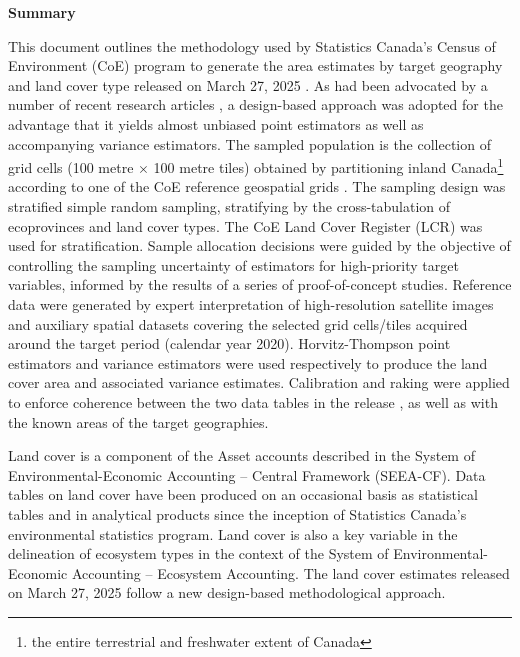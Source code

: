 

\begin{center}
\begin{minipage}{5.5in}
\begin{center}
\textbf{\large Summary}
\end{center}
This document outlines the methodology used by Statistics Canada’s Census of Environment 
(CoE) program to generate the area estimates by target geography and land cover type 
released on March 27, 2025 \cite{StatCanCoELandCoverArea2025}.
As had been advocated by a number of recent research articles
\cite{Gallego2004,Olofsson201442,GreenCongalton2020,Stehman2023ErrorMatrix},
a design-based approach was adopted for the advantage that it yields
almost unbiased point estimators as well as accompanying variance estimators.
The sampled population is the collection of grid cells
(100 metre $\times$ 100 metre tiles) obtained by partitioning
inland Canada\footnote{the entire terrestrial and freshwater extent of Canada}
according to one of the CoE reference geospatial grids \cite{StatCanCoEGridSystem2025}.
The sampling design was stratified simple random sampling,
stratifying by the cross-tabulation of ecoprovinces and land cover types.
The CoE Land Cover Register (LCR) \cite{StatCanCoELCR2025}
was used for stratification.
Sample allocation decisions were guided by the objective of 
controlling the sampling uncertainty of estimators for high-priority target variables,
informed by the results of a series of proof-of-concept studies.
Reference data were generated by expert interpretation of
high-resolution satellite images and auxiliary spatial datasets
covering the selected grid cells/tiles
acquired around the target period (calendar year 2020).
Horvitz-Thompson point estimators and variance estimators were used 
respectively to produce the land cover area and associated variance estimates.
Calibration and raking were applied to enforce coherence
between the two data tables in the release \cite{StatCanCoELandCoverArea2025},
as well as with the known areas of the target geographies.
\end{minipage}
\end{center}


\vskip 1.5cm
Land cover is a component of the Asset accounts described
in the System of Environmental-Economic Accounting -- Central Framework (SEEA-CF).
Data tables on land cover have been produced on an occasional basis
as statistical tables and in analytical products
since the inception of Statistics Canada’s environmental statistics program.
Land cover is also a key variable in the delineation of ecosystem types
in the context of the System of Environmental-Economic Accounting – Ecosystem Accounting.
The land cover estimates released on March 27, 2025 \cite{StatCanCoELandCoverArea2025}
follow a new design-based methodological approach.

